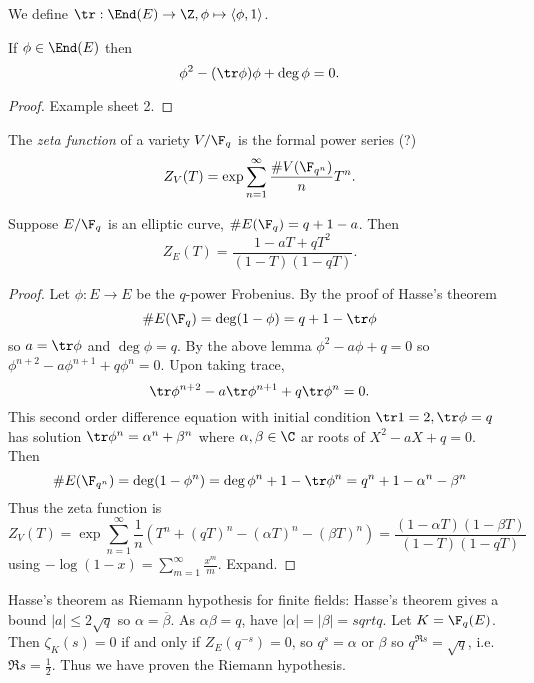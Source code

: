 \documentclass[a4paper]{article}
\theoremstyle{definition}
\theoremstyle{theorem}
\begin{document}
We define \(\tr: \End(E) \to \Z, \phi \mapsto \langle \phi, 1 \rangle\).

\begin{lemma}
  If \(\phi \in \End(E)\) then
  \[
    \phi^2 - (\tr \phi) \phi + \deg \phi = 0.
  \]
\end{lemma}

\begin{proof}
  Example sheet 2.
\end{proof}

\begin{definition}
  The \emph{zeta function} of a variety \(V/\F_q\) is the formal power series (?)
  \[
  Z_V(T) = \exp \sum_{n = 1}^\infty \frac{\# V(\F_{q^n})}{n} T^n.
  \]
\end{definition}

\begin{lemma}
  Suppose \(E/\F_q\) is an elliptic curve, \(\# E(\F_q) = q + 1 - a\). Then
  \[
    Z_E(T) = \frac{1 - aT + qT^2}{(1 - T)(1 - qT)}.
  \]
\end{lemma}

\begin{proof}
  Let \(\phi: E \to E\) be the \(q\)-power Frobenius. By the proof of Hasse's theorem
  \[
    \#E(\F_q) = \deg (1 - \phi) = q + 1 - \tr \phi
  \]
  so \(a = \tr \phi\) and \(\deg \phi = q\). By the above lemma \(\phi^2 - a\phi + q = 0\) so \(\phi^{n + 2} - a \phi^{n + 1} + q \phi^n = 0\). Upon taking trace,
  \[
    \tr \phi^{n + 2} - a \tr \phi^{n + 1} + q \tr \phi^n = 0.
  \]
  This second order difference equation with initial condition \(\tr 1 = 2, \tr \phi = q\) has solution \(\tr \phi^n = \alpha^n + \beta^n\) where \(\alpha, \beta \in \C\) ar roots of \(X^2 - aX + q = 0\). Then
  \[
    \# E(\F_{q^n}) = \deg (1 - \phi^n)
    = \deg \phi^n + 1 - \tr \phi^n
    = q^n + 1 - \alpha^n - \beta^n
  \]
  Thus the zeta function is
  \[
    Z_V(T) = \exp \sum_{n = 1}^\infty \frac{1}{n} (T^n + (qT)^n - (\alpha T)^n - (\beta T)^n)
    = \frac{(1 - \alpha T)(1 - \beta T)}{(1 - T)(1 - qT)}
  \]
  using \(-\log (1 - x) = \sum_{m = 1}^\infty \frac{x^m}{m}\). Expand.
\end{proof}

\begin{remark}
  Hasse's theorem as Riemann hypothesis for finite fields: Hasse's theorem gives a bound \(|a| \leq 2 \sqrt q\) so \(\alpha = \overline \beta\). As \(\alpha\beta = q\), have \(|\alpha| = |\beta| = sqrt q\). Let \(K = \F_q(E)\). Then \(\zeta_K(s) = 0\) if and only if \(Z_E(q^{-s}) = 0\), so \(q^s = \alpha \text{ or } \beta\) so \(q^{\Re s} = \sqrt q\), i.e.\ \(\Re s = \frac{1}{2}\). Thus we have proven the Riemann hypothesis.
\end{remark}
\end{document}
